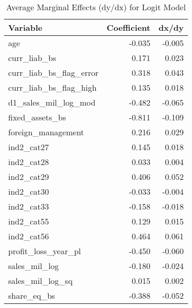 \begin{table}

\caption{\label{tab:}Average Marginal Effects (dy/dx) for Logit Model}
\centering
\begin{tabular}[t]{l|r|r}
\hline
Variable & Coefficient & dx/dy\\
\hline
age & -0.035 & -0.005\\
\hline
curr\_liab\_bs & 0.171 & 0.023\\
\hline
curr\_liab\_bs\_flag\_error & 0.318 & 0.043\\
\hline
curr\_liab\_bs\_flag\_high & 0.135 & 0.018\\
\hline
d1\_sales\_mil\_log\_mod & -0.482 & -0.065\\
\hline
fixed\_assets\_bs & -0.811 & -0.109\\
\hline
foreign\_management & 0.216 & 0.029\\
\hline
ind2\_cat27 & 0.145 & 0.018\\
\hline
ind2\_cat28 & 0.033 & 0.004\\
\hline
ind2\_cat29 & 0.406 & 0.052\\
\hline
ind2\_cat30 & -0.033 & -0.004\\
\hline
ind2\_cat33 & -0.158 & -0.018\\
\hline
ind2\_cat55 & 0.129 & 0.015\\
\hline
ind2\_cat56 & 0.464 & 0.061\\
\hline
profit\_loss\_year\_pl & -0.450 & -0.060\\
\hline
sales\_mil\_log & -0.180 & -0.024\\
\hline
sales\_mil\_log\_sq & 0.015 & 0.002\\
\hline
share\_eq\_bs & -0.388 & -0.052\\
\hline
\end{tabular}
\end{table}